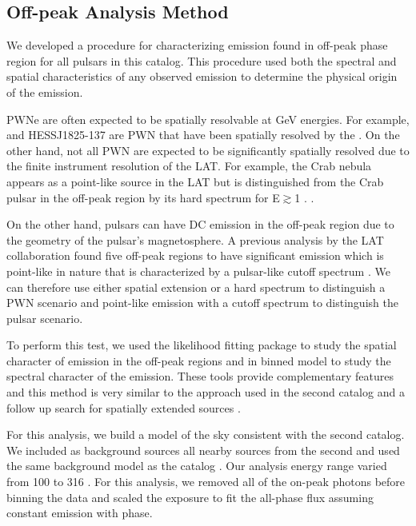 \subsection{Off-peak Analysis Method}
\label{subsec:off_peak_analysis}

We developed a procedure for characterizing emission found
in off-peak phase region for all pulsars in this catalog.  
This procedure used both the spectral and spatial characteristics
of any observed emission to determine the physical origin of the emission.

PWNe are often expected to be spatially
resolvable at GeV energies. For example, \velax and HESS\;J1825-137 are PWN
that have been spatially resolved by the \lat 
\citep{LAT_collaboration_Vela_X_2010,LAT_collaboration_HESS_J1825_2011}.
On the other hand, not all PWN are expected to be
significantly spatially resolved due to the finite
instrument resolution of the LAT. For example, the Crab nebula appears
as a point-like source in the LAT but is distinguished from the Crab
pulsar in the off-peak region by its hard spectrum for E$\gtrsim$1 \gev.
\citep{LAT_collaboration_crab_2010}.

On the other hand, pulsars can have DC emission in the off-peak region
due to the geometry of the pulsar's magnetosphere.  A previous analysis
by the LAT collaboration found five off-peak regions to have significant
emission which is point-like in nature that is characterized by a
pulsar-like cutoff spectrum \citep{LAT_collaboration_PWNCAT_2011}.
We can therefore use either spatial extension or a hard spectrum to
distinguish a PWN scenario and point-like emission with a cutoff spectrum
to distinguish the pulsar scenario.

To perform this test, we used the likelihood fitting package \pointlike
to study the spatial character of emission in the off-peak regions
and \gtlike in binned model to study the spectral character of
the emission. These tools provide complementary features and this
method is very similar to the approach used in the second \lat catalog
\citep{LAT_Collaboration_2FGL_2012} and a follow up search for spatially
extended sources \citep{LAT_collaboration_extended_search_2012}.

For this analysis, we build a model of the sky consistent with the
second \lat catalog. We included as background sources all nearby
sources from the second and used the same background model as the catalog
\citep{LAT_Collaboration_2FGL_2012}.  Our analysis energy range varied
from 100 \mev to 316 \gev.  For this analysis, we removed all of the
on-peak photons before binning the data and scaled the exposure to fit
the all-phase flux assuming constant emission with phase.

